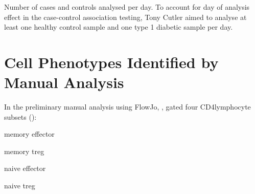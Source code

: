 { Number of cases and controls analysed per day. }
{
  To account for day of analysis effect in the case-control association testing,
  Tony Cutler aimed to analyse
  at least one healthy control sample and one type 1 diabetic sample per day.
}




\section{Cell Phenotypes Identified by Manual Analysis}

In the preliminary manual analysis using FlowJo, ,
gated four CD4\positive lymphocyte subsets ():
\begin{itemise}
  \item memory effector
  \item memory treg
  \item naive effector
  \item naive treg
\end{itemise}
% 
